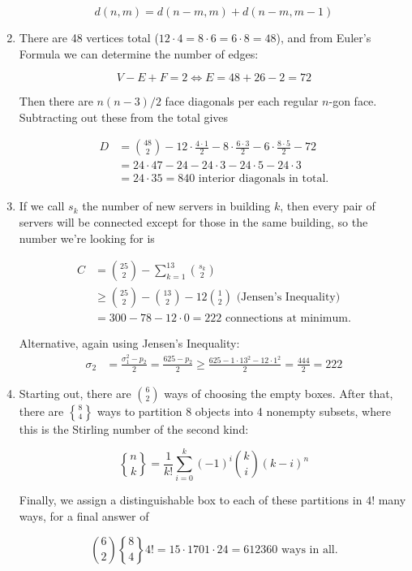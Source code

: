\documentclass{book}
\numberwithin{equation}{section}
\begin{document}
\begin{enumerate}[label={9.\arabic*}]
$$d(n, m) = d(n-m, m) + d(n-m, m-1)$$

\item
There are 48 vertices total ($12 \cdot 4 = 8 \cdot 6 = 6 \cdot 8 = 48$), and from Euler's Formula we can determine the
number of edges:

$$V - E + F = 2 \iff E = 48 + 26 - 2 = 72$$

Then there are $n(n-3)/2$ face diagonals per each regular $n$-gon face. Subtracting out these from the total gives

\begin{align*}
D & = {48 \choose 2} - 12\cdot\frac{4\cdot1}{2} - 8\cdot\frac{6\cdot3}{2} - 6\cdot\frac{8\cdot5}{2} - 72 \\
& = 24\cdot47 - 24 - 24\cdot3 - 24\cdot5 - 24\cdot3 \\
& = 24\cdot35 = 840 \text{ interior diagonals in total.}
\end{align*}

\item
If we call $s_k$ the number of new servers in building $k$, then every pair of servers will be connected except for
those in the same building, so the number we're looking for is

\begin{align*}
C & = {25 \choose 2} - \sum_{k=1}^{13} {s_k \choose 2} \\
& \geq {25 \choose 2} - {13 \choose 2} - 12{1 \choose 2} \text{ (Jensen's Inequality)} \\
& = 300 - 78 - 12\cdot0 = 222 \text{ connections at minimum.}
\end{align*}

Alternative, again using Jensen's Inequality:
\begin{align*}
\sigma_2 & = \frac{\sigma_1^2 - p_2}{2} = \frac{625 - p_2}{2} \geq \frac{625 - 1 \cdot 13^2 - 12 \cdot 1^2}{2} = \frac{444}{2} = 222
\end{align*}

\item
Starting out, there are ${6 \choose 2}$ ways of choosing the empty boxes. After that, there are ${8 \brace 4}$ ways
to partition 8 objects into 4 nonempty subsets, where this is the Stirling number of the second kind:

$${n \brace k} = \frac{1}{k!}\sum_{i=0}^k (-1)^i {k \choose i}(k-i)^n$$

Finally, we assign a distinguishable box to each of these partitions in $4!$ many ways, for a final answer of

$${6 \choose 2}{8 \brace 4}4! = 15\cdot1701\cdot24 = 612360 \text{ ways in all.}$$


\end{enumerate}
\end{document}

